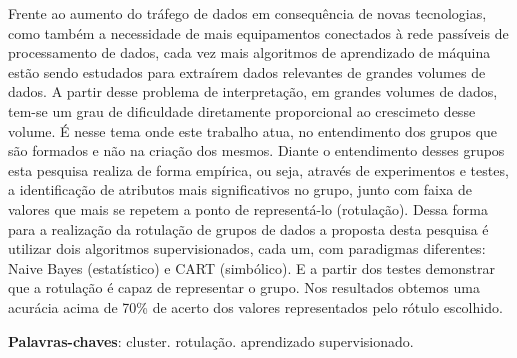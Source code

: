 
\setlength{\absparsep}{18pt} %
\begin{resumo}
Frente ao aumento do tráfego de dados em consequência de novas tecnologias, como também a necessidade de mais equipamentos  conectados à rede passíveis de processamento de dados, cada vez mais algoritmos de aprendizado de máquina estão sendo estudados para  extraírem dados relevantes de grandes volumes de dados. A partir desse problema de interpretação, em grandes volumes de dados, tem-se um grau de dificuldade diretamente proporcional ao crescimeto desse volume. É nesse tema  onde este trabalho atua, no entendimento dos grupos que são formados e não na criação dos mesmos. Diante o entendimento desses grupos esta pesquisa realiza de forma empírica, ou seja, através de experimentos e testes, a identificação de atributos mais significativos no grupo, junto com faixa de valores que mais se repetem a ponto de representá-lo (rotulação).  Dessa forma para a realização da rotulação de grupos de dados a proposta desta pesquisa é utilizar dois algoritmos supervisionados, cada um, com paradigmas diferentes: Naive Bayes (estatístico) e CART (simbólico). E a partir dos testes demonstrar que a rotulação é capaz de representar o grupo. Nos resultados obtemos uma acurácia acima de 70\% de acerto dos valores representados pelo rótulo escolhido.


  \textbf{Palavras-chaves}: cluster. rotulação. aprendizado supervisionado. 
\end{resumo}

